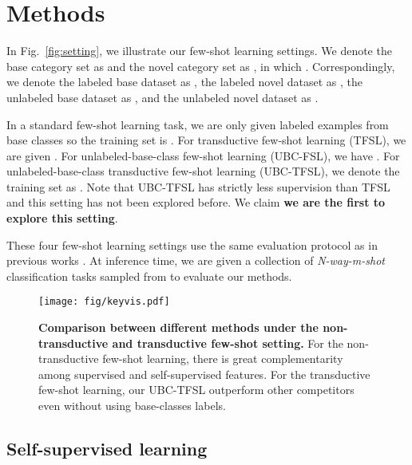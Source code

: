 \documentclass[final]{cvpr}
\newcommand{\secvspace}{\vspace{-0.0em}}
\newcommand{\subsecvspace}{\vspace{-0.0em}}
\newcommand{\figvspace}{\vspace{-0.2em}}
\newcommand{\captionvspace}{\vspace{-0.1em}}
\begin{document}
\secvspace
\section{Methods}
\secvspace





\label{setting}

In Fig.~\ref{fig:setting}, we illustrate our few-shot learning settings.
We denote the base category set as  and the novel category set as , in which . Correspondingly, we denote the labeled base dataset as , the labeled novel dataset as , the unlabeled base dataset as , and the unlabeled novel dataset as . 

In a standard few-shot learning task, we are only given labeled examples from base classes so the training set is . For transductive few-shot learning (TFSL), we are given . For unlabeled-base-class few-shot learning (UBC-FSL), we have . For unlabeled-base-class transductive few-shot learning (UBC-TFSL), we denote the training set as . 
Note that UBC-TFSL has strictly less supervision than TFSL and this setting has not been explored before. We claim \textbf{we are the first to explore this setting}.



These four few-shot learning settings use the same evaluation protocol as in previous works \cite{matchingnet_1shot}. At inference time, we are given a collection of \emph{N-way-m-shot} classification tasks sampled from  to evaluate our methods.




\begin{figure*}[t]
  \centering
  \texttt{[image: fig/keyvis.pdf]}
  \captionvspace
  \vspace{-0.2cm}
  \caption{\textbf{Comparison between different methods under the non-transductive and transductive few-shot setting.} For the non-transductive few-shot learning, there is great complementarity among supervised and self-supervised features. For the transductive few-shot learning, our UBC-TFSL outperform other competitors even without using base-classes labels.
}
  \label{fig:keyvis}
  \figvspace
\end{figure*}

\subsecvspace
\subsection{Self-supervised learning}
\subsecvspace
\end{document}
